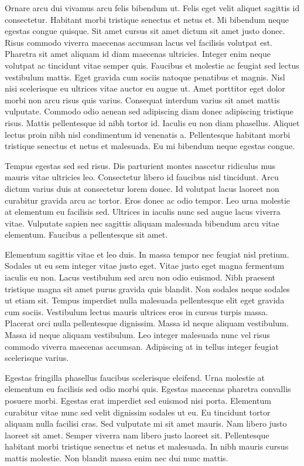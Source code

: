 \documentclass[11pt,a4paper]{article}
\begin{document}
Ornare arcu dui vivamus arcu felis bibendum ut. Felis eget velit aliquet sagittis id consectetur. Habitant morbi tristique senectus et netus et. Mi bibendum neque egestas congue quisque. Sit amet cursus sit amet dictum sit amet justo donec. Risus commodo viverra maecenas accumsan lacus vel facilisis volutpat est. Pharetra sit amet aliquam id diam maecenas ultricies. Integer enim neque volutpat ac tincidunt vitae semper quis. Faucibus et molestie ac feugiat sed lectus vestibulum mattis. Eget gravida cum sociis natoque penatibus et magnis. Nisl nisi scelerisque eu ultrices vitae auctor eu augue ut. Amet porttitor eget dolor morbi non arcu risus quis varius. Consequat interdum varius sit amet mattis vulputate. Commodo odio aenean sed adipiscing diam donec adipiscing tristique risus. Mattis pellentesque id nibh tortor id. Iaculis eu non diam phasellus. Aliquet lectus proin nibh nisl condimentum id venenatis a. Pellentesque habitant morbi tristique senectus et netus et malesuada. Eu mi bibendum neque egestas congue.

Tempus egestas sed sed risus. Dis parturient montes nascetur ridiculus mus mauris vitae ultricies leo. Consectetur libero id faucibus nisl tincidunt. Arcu dictum varius duis at consectetur lorem donec. Id volutpat lacus laoreet non curabitur gravida arcu ac tortor. Eros donec ac odio tempor. Leo urna molestie at elementum eu facilisis sed. Ultrices in iaculis nunc sed augue lacus viverra vitae. Vulputate sapien nec sagittis aliquam malesuada bibendum arcu vitae elementum. Faucibus a pellentesque sit amet.

Elementum sagittis vitae et leo duis. In massa tempor nec feugiat nisl pretium. Sodales ut eu sem integer vitae justo eget. Vitae justo eget magna fermentum iaculis eu non. Lacus vestibulum sed arcu non odio euismod. Nibh praesent tristique magna sit amet purus gravida quis blandit. Non sodales neque sodales ut etiam sit. Tempus imperdiet nulla malesuada pellentesque elit eget gravida cum sociis. Vestibulum lectus mauris ultrices eros in cursus turpis massa. Placerat orci nulla pellentesque dignissim. Massa id neque aliquam vestibulum. Massa id neque aliquam vestibulum. Leo integer malesuada nunc vel risus commodo viverra maecenas accumsan. Adipiscing at in tellus integer feugiat scelerisque varius.

Egestas fringilla phasellus faucibus scelerisque eleifend. Urna molestie at elementum eu facilisis sed odio morbi quis. Egestas maecenas pharetra convallis posuere morbi. Egestas erat imperdiet sed euismod nisi porta. Elementum curabitur vitae nunc sed velit dignissim sodales ut eu. Eu tincidunt tortor aliquam nulla facilisi cras. Sed vulputate mi sit amet mauris. Nam libero justo laoreet sit amet. Semper viverra nam libero justo laoreet sit. Pellentesque habitant morbi tristique senectus et netus et malesuada. In nibh mauris cursus mattis molestie. Non blandit massa enim nec dui nunc mattis.
\end{document}
